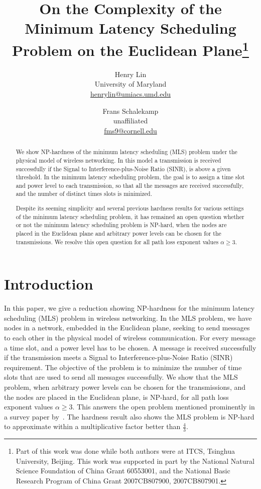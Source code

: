 \documentclass{article}
\begin{document}
\title{On the Complexity of the Minimum Latency Scheduling Problem on the Euclidean Plane\thanks{Part of this work was done while both authors were at ITCS, Tsinghua University, Beijing. This work was supported in
part by the National Natural Science Foundation of China Grant
60553001, and the National Basic Research Program of China Grant
2007CB807900, 2007CB807901.}}

\author{Henry Lin \\ University of Maryland 
\\ \url{henrylin@umiacs.umd.edu}
\and Frans Schalekamp \\ unaffiliated \\ \url{fms9@cornell.edu}
}

\maketitle

\begin{abstract}
We show NP-hardness of the minimum latency scheduling (MLS) problem under the physical model of wireless networking.  In this model a transmission is received successfully if the Signal to Interference-plus-Noise Ratio (SINR), is above a given threshold.  In the minimum latency scheduling problem, the goal is to assign a time slot and power level to each transmission, so that all the messages are received successfully, and the number of distinct times slots is minimized.

Despite its seeming simplicity and several previous hardness results for various settings of the minimum latency scheduling problem, it has remained an open question whether or not the minimum latency scheduling problem is NP-hard, when the nodes are placed in the Euclidean plane and arbitrary power levels can be chosen for the transmissions. We resolve this open question for all path loss exponent values $\alpha \geq 3$.
\end{abstract}


\section{Introduction}
In this paper, we give a reduction showing NP-hardness for the minimum latency scheduling (MLS) problem in wireless networking. In the MLS problem, we have nodes in a network, embedded in the Euclidean plane, seeking to send messages to each other in the physical model of wireless communication. For every message a time slot, and a power level has to be chosen. A message is received successfully if the transmission meets a Signal to Interference-plus-Noise Ratio (SINR) requirement. The objective of the problem is to minimize the number of time slots that are used to send all messages successfully. We show that the MLS problem, when arbitrary power levels can be chosen for the transmissions, and the nodes are placed in the Euclidean plane, is NP-hard, for all path loss exponent values $\alpha \geq 3$. This answers the open problem mentioned prominently in a survey paper by~\cite{LRW08}.   The hardness result also shows the MLS problem is NP-hard to approximate within a multiplicative factor better than $\frac{4}{3}$.
\end{document}
